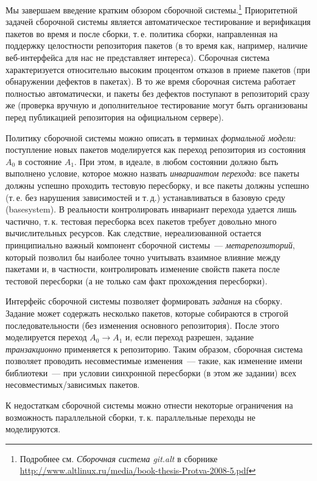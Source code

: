 \documentclass[russian,a4paper,12pt,titlepage]{article}
\begin{document}
Мы завершаем введение кратким обзором сборочной системы.\footnote{Подробнее см. \textit{Сборочная система git.alt}
в сборнике \url{http://www.altlinux.ru/media/book-thesis-Protva-2008-5.pdf}}  Приоритетной задачей сборочной системы
является автоматическое тестирование и верификация пакетов во время и после сборки, т.\,е. политика сборки, направленная
на поддержку целостности репозитория пакетов (в то время как, например, наличие веб-интерфейса для нас не представляет интереса).
Сборочная система характеризуется относительно высоким процентом отказов в приеме пакетов (при обнаружении дефектов в пакетах).
В то же время сборочная система работает полностью автоматически, и пакеты без дефектов поступают в репозиторий сразу же (проверка
вручную и дополнительное тестирование могут быть организованы перед публикацией репозитория на официальном сервере).

Политику сборочной системы можно описать в терминах \textit{формальной модели}: поступление новых пакетов моделируется
как переход репозитория из состояния $A_0$ в состояние $A_1$.  При этом, в идеале, в любом состоянии должно быть выполнено
условие, которое можно назвать \textit{инвариантом перехода}: все пакеты должны успешно проходить тестовую пересборку,
и все пакеты должны успешно (т.\,е. без нарушения зависимостей и т.\,д.) устанавливаться в базовую среду (basesystem).
В реальности контролировать инвариант перехода
удается лишь частично, т.\,к. тестовая пересборка всех пакетов требует довольно много вычислительных ресурсов.
Как следствие, нереализованной остается принципиально важный компонент сборочной системы~--- \textit{метарепозиторий},
который позволил бы наиболее точно учитывать взаимное влияние между пакетами и, в частности, контролировать изменение свойств пакета
после тестовой пересборки (а не только сам факт прохождения пересборки).

Интерфейс сборочной системы позволяет формировать \textit{задания} на сборку.  Задание может содержать несколько
пакетов, которые собираются в строгой последовательности (без изменения основного репозитория).  После этого моделируется
переход $A_0\to A_1$ и, если переход разрешен, задание \textit{транзакционно} применяется к репозиторию.  Таким образом,
сборочная система позволяет проводить несовместимые изменения~--- такие, как изменение имени библиотеки~--- при условии
синхронной пересборки (в этом же задании) всех несовместимых/зависимых пакетов.

К недостаткам сборочной системы можно отнести некоторые ограничения на возможность параллельной сборки,
т.\,к. параллельные переходы не моделируются.
\end{document}
